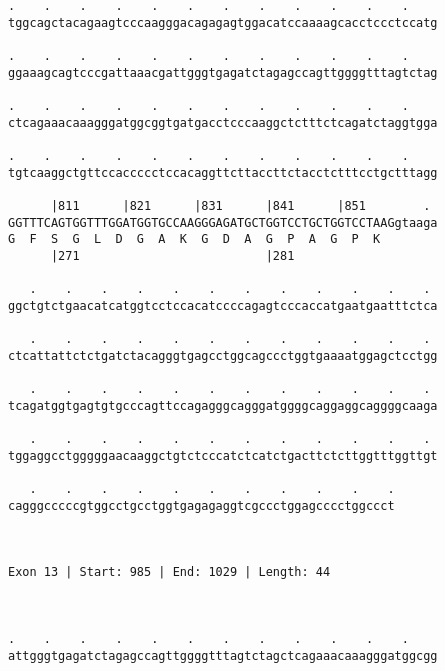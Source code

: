 \documentclass{article}
\begin{document}
\begin{Verbatim}
.    .    .    .    .    .    .    .    .    .    .    .    
tggcagctacagaagtcccaagggacagagagtggacatccaaaagcacctccctccatg
                                                            
.    .    .    .    .    .    .    .    .    .    .    .    
ggaaagcagtcccgattaaacgattgggtgagatctagagccagttggggtttagtctag
                                                            
.    .    .    .    .    .    .    .    .    .    .    .    
ctcagaaacaaagggatggcggtgatgacctcccaaggctctttctcagatctaggtgga
                                                            
.    .    .    .    .    .    .    .    .    .    .    .    
tgtcaaggctgttccaccccctccacaggttcttaccttctacctctttcctgctttagg
                                                            
      |811      |821      |831      |841      |851        . 
GGTTTCAGTGGTTTGGATGGTGCCAAGGGAGATGCTGGTCCTGCTGGTCCTAAGgtaaga
G  F  S  G  L  D  G  A  K  G  D  A  G  P  A  G  P  K        
      |271                          |281                    
  
   .    .    .    .    .    .    .    .    .    .    .    . 
ggctgtctgaacatcatggtcctccacatccccagagtcccaccatgaatgaatttctca
                                                            
   .    .    .    .    .    .    .    .    .    .    .    . 
ctcattattctctgatctacagggtgagcctggcagccctggtgaaaatggagctcctgg
                                                            
   .    .    .    .    .    .    .    .    .    .    .    . 
tcagatggtgagtgtgcccagttccagagggcagggatggggcaggaggcaggggcaaga
                                                            
   .    .    .    .    .    .    .    .    .    .    .    . 
tggaggcctgggggaacaaggctgtctcccatctcatctgacttctcttggtttggttgt
                                                            
   .    .    .    .    .    .    .    .    .    .    .
cagggcccccgtggcctgcctggtgagagaggtcgccctggagcccctggccct
                                                      
                                                      
 
Exon 13 | Start: 985 | End: 1029 | Length: 44



.    .    .    .    .    .    .    .    .    .    .    .    
attgggtgagatctagagccagttggggtttagtctagctcagaaacaaagggatggcgg
                                                            

\end{Verbatim}
\end{document}
